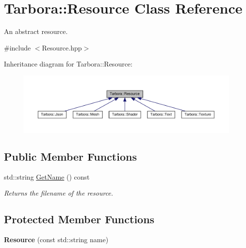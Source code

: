 \hypertarget{classTarbora_1_1Resource}{}\section{Tarbora\+:\+:Resource Class Reference}
\label{classTarbora_1_1Resource}


An abstract resource.  




{\ttfamily \#include $<$Resource.\+hpp$>$}



Inheritance diagram for Tarbora\+:\+:Resource\+:\nopagebreak
\begin{figure}[H]
\begin{center}
\leavevmode
\includegraphics[width=350pt]{classTarbora_1_1Resource__inherit__graph}
\end{center}
\end{figure}
\subsection*{Public Member Functions}
\begin{DoxyCompactItemize}
\item 
\mbox{\label{classTarbora_1_1Resource_a4483e47dbcd9f291bce9671983437ee3}} 
std\+::string \hyperlink{classTarbora_1_1Resource_a4483e47dbcd9f291bce9671983437ee3}{Get\+Name} () const
\begin{DoxyCompactList}\small\item\em Returns the filename of the resource. \end{DoxyCompactList}\end{DoxyCompactItemize}
\subsection*{Protected Member Functions}
\begin{DoxyCompactItemize}
\item 
\mbox{\label{classTarbora_1_1Resource_adea9c80b8f7452ed0cd195ac5d352b0b}} 
{\bfseries Resource} (const std\+::string name)
\end{DoxyCompactItemize}
